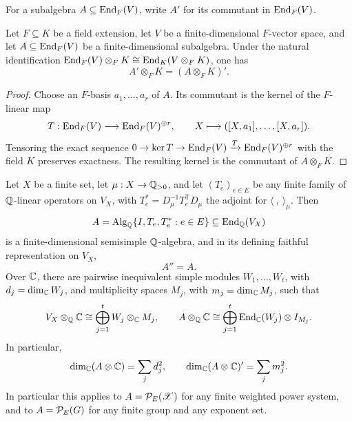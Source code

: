 For a subalgebra \(A\subseteq\operatorname{End}_F(V)\), write \(A'\) for its commutant
in \(\operatorname{End}_F(V)\).

\begin{lemma}
\label{lem:commutant-base-change}
Let \(F\subseteq K\) be a field extension, let \(V\) be a
finite-dimensional \(F\)-vector space, and let
\(A\subseteq\operatorname{End}_F(V)\) be a finite-dimensional subalgebra.  Under the
natural identification
\(\operatorname{End}_F(V)\otimes_FK\cong\operatorname{End}_K(V\otimes_FK)\), one has
\begin{equation}
 A'\otimes_FK=(A\otimes_FK)'.
 \label{eq:commutant-base-change}
\end{equation}
\end{lemma}

\begin{proof}
Choose an \(F\)-basis \(a_1,\ldots,a_r\) of \(A\).  Its commutant is the
kernel of the \(F\)-linear map
\[
 T:\operatorname{End}_F(V)\longrightarrow\operatorname{End}_F(V)^{\oplus r},
 \qquad X\longmapsto([X,a_1],\ldots,[X,a_r]).
\]
Tensoring the exact sequence
\(0\to\ker T\to\operatorname{End}_F(V)\xrightarrow{T}\operatorname{End}_F(V)^{\oplus r}\)
with the field \(K\) preserves exactness.  The resulting kernel is
the commutant of \(A\otimes_FK\).
\end{proof}

\begin{theorem}
\label{thm:rational-bicommutant-structural}
Let \(X\) be a finite set, let \(\mu:X\to\mathbb Q_{>0}\), and let
\((T_e)_{e\in E}\) be any finite family of \(\mathbb Q\)-linear operators on
\(V_X\), with \(T_e^*=D_\mu^{-1}T_e^{\mathsf T}D_\mu\) the adjoint for
\(\langle\ ,\ \rangle_\mu\).  Then
\[
 A=\operatorname{Alg}_\mathbb Q\{I,T_e,T_e^*:e\in E\}\subseteq\operatorname{End}_\mathbb Q(V_X)
\]
is a finite-dimensional semisimple \(\mathbb Q\)-algebra, and in its defining
faithful representation on \(V_X\),
\begin{equation}
 A''=A.
 \label{eq:rational-double-commutant-structural}
\end{equation}
Over \(\mathbb C\), there are pairwise inequivalent simple modules
\(W_1,\ldots,W_t\), with \(d_j=\dim_\mathbb C W_j\), and multiplicity spaces
\(M_j\), with \(m_j=\dim_\mathbb C M_j\), such that
\begin{equation}
 V_X\otimes_\mathbb Q\mathbb C\cong\bigoplus_{j=1}^t W_j\otimes_\mathbb C M_j,
 \qquad
 A\otimes_\mathbb Q\mathbb C\cong
 \bigoplus_{j=1}^t\operatorname{End}_\mathbb C(W_j)\otimes I_{M_j}.
 \label{eq:complex-isotypic-structural}
\end{equation}
In particular,
\begin{equation}
 \dim_\mathbb C(A\otimes\mathbb C)=\sum_jd_j^2,
 \qquad
 \dim_\mathbb C(A\otimes\mathbb C)'=\sum_jm_j^2.
 \label{eq:dimension-identities-structural}
\end{equation}
In particular this applies to \(A=\mathcal P_E(\mathscr X)\) for any finite weighted
power system, and to \(A=\mathcal P_E(G)\) for any finite group and any exponent set.
\end{theorem}

